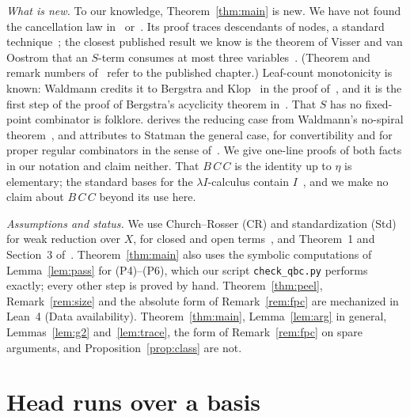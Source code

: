 \documentclass[11pt]{amsart}
\theoremstyle{definition}
\begin{document}
\emph{What is new.} To our knowledge, Theorem~\ref{thm:main} is new. We have not found the cancellation
law in~\citep{dots} or~\citep{waldmann-ic}. Its proof traces descendants of nodes, a standard
technique~\citep[ch.~8]{terese}; the closest published result we know is the theorem of Visser and van
Oostrom that an $S$-term consumes at most three variables~\citep[Theorem~22]{dots}. (Theorem and remark
numbers of~\citep{dots} refer to the published chapter.) Leaf-count monotonicity is known: Waldmann
credits it to Bergstra and Klop~\citep{bergstra-klop79} in the proof of~\citep[Proposition~4]{waldmann-ic},
and it is the first step of the proof of Bergstra's acyclicity theorem in~\citep[Theorem~13]{dots}.
That $S$ has no fixed-point combinator is folklore. \citep[Remark~15]{dots} derives the reducing case
from Waldmann's no-spiral theorem~\citep{waldmann-ic}, and attributes to Statman the general case, for
convertibility and for proper regular combinators in the sense of~\citep[p.~319]{smullyan94}. We give
one-line proofs of both facts in our notation and claim neither. That $B\,C\,C$ is the identity up to
$\eta$ is elementary; the standard bases for the $\lambda I$-calculus contain
$I$~\citep{church41,curryfeys,broda-damas}, and we make no claim about $B\,C\,C$ beyond its use here.

\emph{Assumptions and status.} We use Church--Rosser (CR) and standardization (Std) for weak reduction
over $X$, for closed and open terms~\citep{terese,hindley78}, and Theorem~1 and Section~3
of~\citep{s11}. Theorem~\ref{thm:main} also uses the symbolic computations of Lemma~\ref{lem:pass}
for (P4)--(P6), which our script \texttt{check\_qbc.py} performs exactly; every other step is proved by
hand. Theorem~\ref{thm:peel}, Remark~\ref{rem:size} and the absolute form of Remark~\ref{rem:fpc} are
mechanized in Lean~4 (Data availability). Theorem~\ref{thm:main}, Lemma~\ref{lem:arg} in general,
Lemmas~\ref{lem:g2} and~\ref{lem:trace}, the form of Remark~\ref{rem:fpc} on spare arguments, and
Proposition~\ref{prop:class} are not.

\section{Head runs over a basis}\label{sec:runs}
\end{document}
